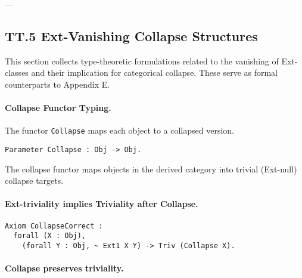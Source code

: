 \documentclass[11pt]{article}
\begin{document}
\begin{center}
\end{center}

---

\subsection*{TT.5 Ext-Vanishing Collapse Structures}

This section collects type-theoretic formulations related to the vanishing of Ext-classes  
and their implication for categorical collapse. These serve as formal counterparts to Appendix E.

\paragraph{Collapse Functor Typing.}

The functor \texttt{Collapse} maps each object to a collapsed version.

\noindent
\begin{lstlisting}
Parameter Collapse : Obj -> Obj.
\end{lstlisting}


The collapse functor maps objects in the derived category into trivial (Ext-null) collapse targets.

\paragraph{Ext-triviality implies Triviality after Collapse.}

\noindent
\begin{lstlisting}[language=Coq, breaklines=true]
Axiom CollapseCorrect :
  forall (X : Obj),
    (forall Y : Obj, ~ Ext1 X Y) -> Triv (Collapse X).
\end{lstlisting}

\paragraph{Collapse preserves triviality.}
\end{document}
